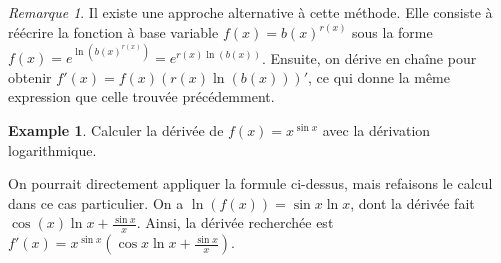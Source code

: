 \documentclass[12pt]{article}
\theoremstyle{definition}
\newtheorem{ex}{Example}
\theoremstyle{remark}
\newtheorem*{rem}{Remarque}
\begin{document}
\begin{rem}
    Il existe une approche alternative à cette méthode. Elle consiste à réécrire la fonction à base variable $f(x) = b(x)^{r(x)}$ sous la forme $f(x) = e^{\ln(b(x)^{r(x)})} = e^{r(x) \ln(b(x))}$. Ensuite, on dérive en chaîne pour obtenir $f'(x) = f(x)(r(x) \ln(b(x)))'$, ce qui donne la même expression que celle trouvée précédemment.
\end{rem}

\begin{ex}
    Calculer la dérivée de $f(x) = x^{\sin x}$ avec la dérivation logarithmique.
    
    On pourrait directement appliquer la formule ci-dessus, mais refaisons le calcul dans ce cas particulier. On a $\ln(f(x)) = \sin x \ln x$, dont la dérivée fait $\cos(x) \ln x + \frac{\sin x}{x}$. Ainsi, la dérivée recherchée est $f'(x) = x^{\sin x}\left( \cos x \ln x + \frac{\sin x}{x} \right)$.
\end{ex}
\end{document}

